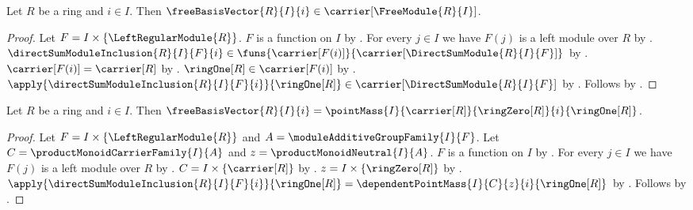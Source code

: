 \begin{proposition}\label{free_basis_vector_type}
    Let $R$ be a ring and $i\in I$.
    Then $\freeBasisVector{R}{I}{i}
        \in\carrier[\FreeModule{R}{I}]$.
\end{proposition}
\begin{proof}
    Let $F=I\times\{\LeftRegularModule{R}\}$.
    $F$ is a function on $I$ by
        .
    For every $j\in I$ we have $F(j)$ is a left module over $R$ by
        .
    $\directSumModuleInclusion{R}{I}{F}{i}\in
        \funs{\carrier[F(i)]}{
            \carrier[\DirectSumModule{R}{I}{F}]}$ by
        .
    $\carrier[F(i)]=\carrier[R]$ by
        .
    $\ringOne[R]\in\carrier[F(i)]$ by .
    $\apply{\directSumModuleInclusion{R}{I}{F}{i}}{\ringOne[R]}
        \in\carrier[\DirectSumModule{R}{I}{F}]$ by
        .
    Follows by
        .
\end{proof}

\begin{proposition}\label{free_basis_vector_point_mass}
    Let $R$ be a ring and $i\in I$.
    Then
        $\freeBasisVector{R}{I}{i}
            =\pointMass{I}{\carrier[R]}{\ringZero[R]}{i}{
                \ringOne[R]}$.
\end{proposition}
\begin{proof}
    Let $F=I\times\{\LeftRegularModule{R}\}$ and
        $A=\moduleAdditiveGroupFamily{I}{F}$.
    Let $C=\productMonoidCarrierFamily{I}{A}$ and
        $z=\productMonoidNeutral{I}{A}$.
    $F$ is a function on $I$ by
        .
    For every $j\in I$ we have $F(j)$ is a left module over $R$ by
        .
    $C=I\times\{\carrier[R]\}$ by
        .
    $z=I\times\{\ringZero[R]\}$ by
        .
    $\apply{\directSumModuleInclusion{R}{I}{F}{i}}{\ringOne[R]}
        =\dependentPointMass{I}{C}{z}{i}{\ringOne[R]}$ by
        .
    Follows by .
\end{proof}

